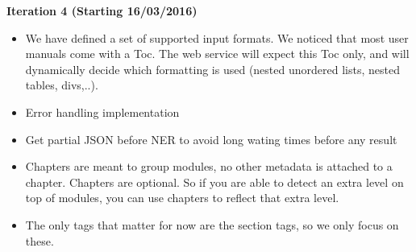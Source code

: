 \documentclass[a4paper,12pt]{article}
\begin{document}
\textbf{Iteration 4 (Starting 16/03/2016)}
\begin{itemize}
 \item We have defined a set of supported input formats. We noticed that most user manuals come with a Toc. The web service will expect this Toc only, and will dynamically decide which formatting is used (nested unordered lists, nested tables, divs,..). 
 \item Error handling implementation
 \item Get partial JSON before NER to avoid long wating times before any result

 \item Chapters are meant to group modules, no other metadata is attached to a chapter. Chapters are optional. So if you are able to detect an extra level on top of modules, you can use chapters to reflect that extra level.
\item  The only tags that matter for now are the section tags, so we only focus on these.
\end{itemize}
\end{document}
